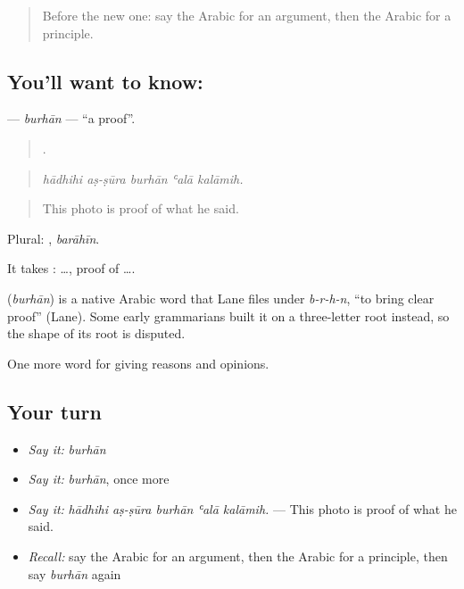 \label{lesson:AR-C358-burhan}



\begin{quote}
Before the new one: say the Arabic for an argument, then the Arabic for a principle.
\end{quote}

\subsection*{You'll want to know: }
\textbf{} — \emph{burhān} — \textquotedblleft{}a proof\textquotedblright{}.

\begin{quote}
    .
\end{quote}

\begin{quote}
\emph{hādhihi aṣ-ṣūra burhān ʿalā kalāmih.}
\end{quote}

\begin{quote}
This photo is proof of what he said.
\end{quote}

Plural: , \emph{barāhīn}.

It takes :   …, proof of ….

\begin{cousinweb}
\textbf{} (\emph{burhān}) is a native Arabic word that Lane files under \emph{b-r-h-n}, \textquotedblleft{}to bring clear proof\textquotedblright{} (Lane). Some early grammarians built it on a three-letter root instead, so the shape of its root is disputed.
\end{cousinweb}

\begin{grammarlens}[title={What you've built}]
One more word for giving reasons and opinions.
\end{grammarlens}

\subsection*{Your turn}
\begin{itemize}
\raggedright
  \item \emph{Say it:} \emph{burhān}
  \item \emph{Say it:} \emph{burhān}, once more
  \item \emph{Say it:} \emph{hādhihi aṣ-ṣūra burhān ʿalā kalāmih.} — This photo is proof of what he said.
  \item \emph{Recall:} say the Arabic for an argument, then the Arabic for a principle, then say \emph{burhān} again
\end{itemize}

